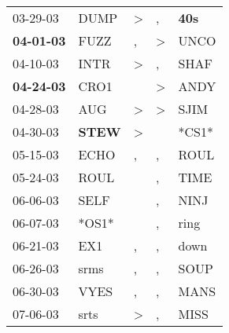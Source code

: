 \begin{supertabular}{p{0.07\textwidth}p{0.06\textwidth}p{0.02\textwidth}p{0.02\textwidth}p{0.06\textwidth}}
          03-29-03\textsuperscript{} &           DUMP\textsuperscript{} &     \textgreater &                , &   \textbf{40s\textsuperscript{}} \\
 \textbf{04-01-03\textsuperscript{}} &           FUZZ\textsuperscript{} &                , &     \textgreater &           UNCO\textsuperscript{} \\
          04-10-03\textsuperscript{} &           INTR\textsuperscript{} &     \textgreater &                , &           SHAF\textsuperscript{} \\
 \textbf{04-24-03\textsuperscript{}} &           CRO1\textsuperscript{} &                  &     \textgreater &           ANDY\textsuperscript{} \\
          04-28-03\textsuperscript{} &            AUG\textsuperscript{} &     \textgreater &     \textgreater &           SJIM\textsuperscript{} \\
          04-30-03\textsuperscript{} &  \textbf{STEW\textsuperscript{}} &     \textgreater &                  &                            *CS1* \\
          05-15-03\textsuperscript{} &           ECHO\textsuperscript{} &                , &                , &           ROUL\textsuperscript{} \\
          05-24-03\textsuperscript{} &           ROUL\textsuperscript{} &                  &                , &           TIME\textsuperscript{} \\
          06-06-03\textsuperscript{} &           SELF\textsuperscript{} &                  &                , &           NINJ\textsuperscript{} \\
          06-07-03\textsuperscript{} &                            *OS1* &                  &                , &           ring\textsuperscript{} \\
          06-21-03\textsuperscript{} &            EX1\textsuperscript{} &                , &                , &           down\textsuperscript{} \\
          06-26-03\textsuperscript{} &           srms\textsuperscript{} &                , &                , &           SOUP\textsuperscript{} \\
          06-30-03\textsuperscript{} &           VYES\textsuperscript{} &                , &                , &           MANS\textsuperscript{} \\
          07-06-03\textsuperscript{} &           srts\textsuperscript{} &     \textgreater &                , &           MISS\textsuperscript{} \\

\end{supertabular}

